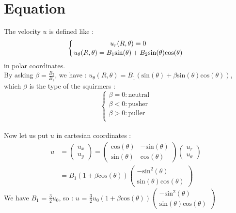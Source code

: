 \documentclass[options]{article}
\begin{document}
\section{Equation}
The velocity $u$ is defined like :
\newline $$ \left\{ u_r(R,\theta)=0
\atop u_\theta(R,\theta) = B_1\mathrm{sin}(\theta)+B_2\mathrm{sin}(\theta)\mathrm{cos}(\theta) \right.$$
in polar coordinates.
\\ By asking $\beta=\frac{B_2}{B_1}$, we have :
$u_\theta(R,\theta) = B_1(\mathrm{sin}(\theta) + \beta \mathrm{sin}(\theta)\mathrm{cos}(\theta))$, which $\beta$ is the type of the squirmers :
$$\left\{
    \begin{array}{ll}
        \beta = 0 : \mathrm{neutral} \\
        \beta < 0 : \mathrm{pusher} \\
        \beta > 0 : \mathrm{puller} \\
    \end{array}
\right.$$
\\ Now let us put $u$ in cartesian coordinates :
\begin{align*}
    u &= \begin{pmatrix}
   u_x \\
   u_y
\end{pmatrix}
= \begin{pmatrix}
   \mathrm{cos}(\theta) & -\mathrm{sin}(\theta) \\
   \mathrm{sin}(\theta) & \mathrm{cos}(\theta)
\end{pmatrix}
\begin{pmatrix}
   u_r \\
   u_\theta
\end{pmatrix} \\
&= B_1 (1 + \beta \mathrm{cos}(\theta))
\begin{pmatrix}
   -\mathrm{sin}^2(\theta) \\
   \mathrm{sin}(\theta)\mathrm{cos}(\theta)
\end{pmatrix}
\end{align*}
We have $B_1$ = $\frac{3}{2}u_0$, so :
$u$ = $\frac{3}{2}u_0 (1 + \beta \mathrm{cos}(\theta))
\begin{pmatrix}
   -\mathrm{sin}^2(\theta) \\
   \mathrm{sin}(\theta)\mathrm{cos}(\theta)
\end{pmatrix}$
\end{document}
